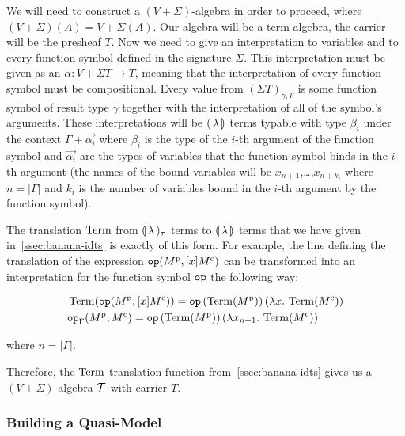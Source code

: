 We will need to construct a $(V+\Sigma)$-algebra in order to proceed, where
$(V+\Sigma)(A) = V + \Sigma(A)$. Our algebra will be a term algebra, the
carrier will be the presheaf $T$. Now we need to give an interpretation to
variables and to every function symbol defined in the signature
$\Sigma$. This interpretation must be given as an
$\alpha : V + \Sigma T \to T$, meaning that the interpretation of every
function symbol must be compositional. Every value from
$(\Sigma T)_{\gamma,\Gamma}$ is some function symbol of result type
$\gamma$ together with the interpretation of all of the symbol's
arguments. These interpretations will be $\llparenthesis \, \lambda \, \rrparenthesis$ terms typable
with type $\beta_i$ under the context $\Gamma + \vec{\alpha_i}$ where
$\beta_i$ is the type of the $i$-th argument of the function symbol and
$\vec{\alpha_i}$ are the types of variables that the function symbol binds
in the $i$-th argument (the names of the bound variables will be
$x_{n+1}$,\ldots,$x_{n+k_i}$ where $n = |\Gamma|$ and $k_i$ is the number
of variables bound in the $i$-th argument by the function symbol).

The translation $\operatorname{Term}$ from $\llparenthesis \, \lambda \, \rrparenthesis_\tau$ terms to
$\llparenthesis \, \lambda \, \rrparenthesis$ terms that we have given in~\ref{ssec:banana-idts} is
exactly of this form. For example, the line defining the translation of the
expression $\mathtt{op}(M^{\mathrm{p}}, [x] M^{\mathrm{c}})$ can be transformed into an
interpretation for the function symbol $\mathtt{op}$ the following way:

\begin{align*}
  & \operatorname{Term}(\mathtt{op}(M^{\mathrm{p}}, [x] M^{\mathrm{c}})) =
    \mathtt{op}\,(\operatorname{Term}(M^{\mathrm{p}}))\,(\lambda x.\, \operatorname{Term}(M^{\mathrm{c}})) \\
  & \mathtt{op}_\Gamma(M^{\mathrm{p}}, M^{\mathrm{c}}) =
    \mathtt{op}\,(\operatorname{Term}(M^{\mathrm{p}}))\,(\lambda x_{n+1}.\, \operatorname{Term}(M^{\mathrm{c}})) \\
\end{align*}

where $n = |\Gamma|$.

Therefore, the $\operatorname{Term}$ translation function from~\ref{ssec:banana-idts}
gives us a $(V+\Sigma)$-algebra $\mathcal{T}$ with carrier $T$.



\subsubsection{Building a Quasi-Model}
\label{sssec:quasi-model}

